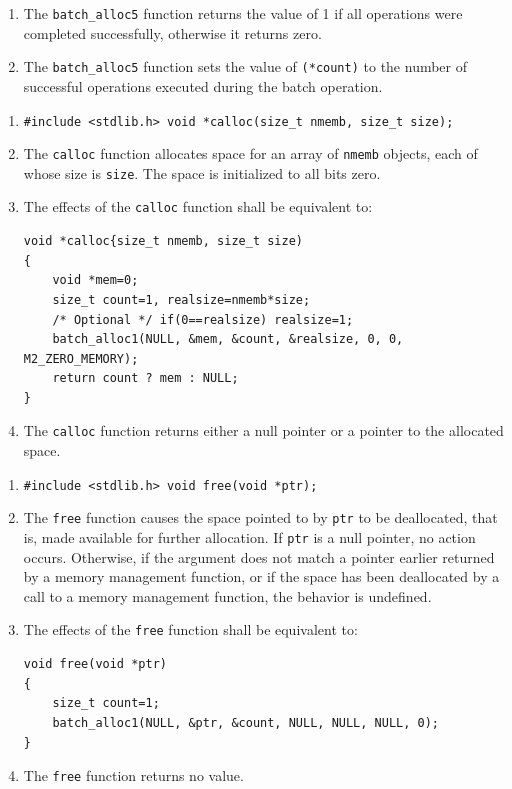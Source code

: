 \documentclass[wd]{isov2}
\begin{document}
{\begin{enumerate}
\item The \texttt{batch\_alloc5} function returns the value of 1 if all operations were completed successfully, otherwise it returns zero.
\item The \texttt{batch\_alloc5} function sets the value of \texttt{(*count)} to the number of successful operations executed during the batch operation.
\end{enumerate}
\color{black}

\begin{enumerate}
\renewcommand{\theenumi}{\arabic{enumi}}
\item \texttt{\#include <stdlib.h>\linebreak
void *calloc(size\_t nmemb, size\_t size);}
\item The \texttt{calloc} function allocates space for an array of \texttt{nmemb} objects, each of whose size is \texttt{size}. The space is initialized to all bits zero.
\color{changed}
\item The effects of the \texttt{calloc} function shall be equivalent to:
\begin{verbatim}
void *calloc{size_t nmemb, size_t size)
{
    void *mem=0;
    size_t count=1, realsize=nmemb*size;
    /* Optional */ if(0==realsize) realsize=1;
    batch_alloc1(NULL, &mem, &count, &realsize, 0, 0, M2_ZERO_MEMORY);
    return count ? mem : NULL;
}
\end{verbatim}
\color{black}
\item The \texttt{calloc} function returns either a null pointer or a pointer to the allocated space.
\end{enumerate}

\begin{enumerate}
\renewcommand{\theenumi}{\arabic{enumi}}
\item \texttt{\#include <stdlib.h>\linebreak
void free(void *ptr);}
\item The \texttt{free} function causes the space pointed to by \texttt{ptr} to be deallocated, that is, made available for further allocation. If \texttt{ptr} is a null pointer, no action occurs. Otherwise, if the argument does not match a pointer earlier returned by a memory management function, or if the space has been deallocated by a call to \textcolor{changed}{a memory management function}, the behavior is undefined.
\color{changed}
\item The effects of the \texttt{free} function shall be equivalent to:
\begin{verbatim}
void free(void *ptr)
{
    size_t count=1;
    batch_alloc1(NULL, &ptr, &count, NULL, NULL, NULL, 0);
}
\end{verbatim}
\color{black}
\item The \texttt{free} function returns no value.
\end{enumerate}

}
\end{document}
